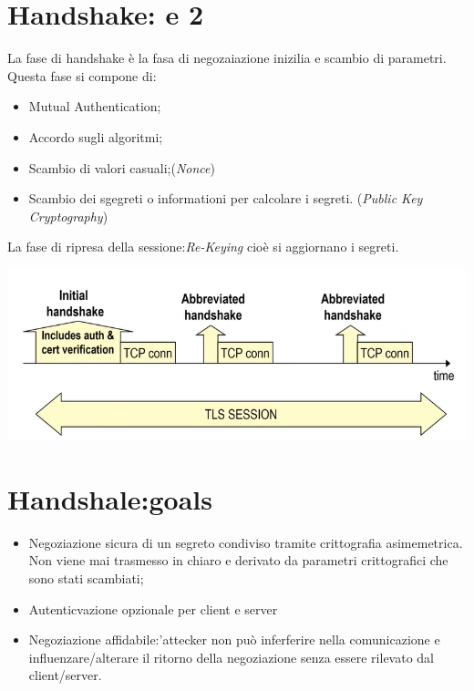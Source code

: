 \documentclass{book}
\theoremstyle{remark}
\begin{document}
\section{Handshake:  e 2}
La fase di handshake è la fasa di negozaiazione inizilia e scambio di parametri\@. Questa fase si compone di:
\begin{itemize}
	\item Mutual Authentication;\@
	\item Accordo sugli algoritmi;\@
	\item Scambio di valori casuali;\@ (\emph{Nonce})
	\item Scambio dei sgegreti o informationi per calcolare i segreti\@. (\emph{Public Key Cryptography})
\end{itemize}
La fase di ripresa della sessione:\@\emph{Re-Keying} cioè si aggiornano i segreti\@.
\begin{center}
	\includegraphics*[scale=0.8]{2021-11-22-14-35-06.png}
\end{center}
\section{Handshale:goals}
\begin{itemize}
	\item Negoziazione sicura di un segreto condiviso tramite crittografia asimemetrica\@. Non viene mai trasmesso in chiaro e derivato
	      da parametri crittografici che sono stati scambiati;\@
	\item Autenticvazione opzionale per client e server
	\item Negoziazione affidabile:\@l'attecker non può inferferire nella comunicazione e influenzare/alterare il ritorno della negoziazione senza essere rilevato dal client/server\@.
\end{itemize}
\end{document}
